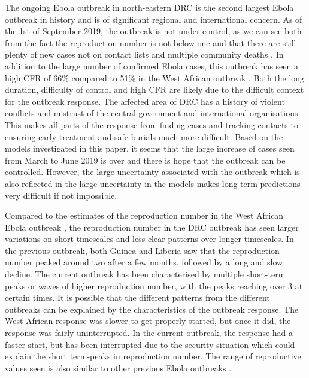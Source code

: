 \documentclass[12pt]{article}
\begin{document}
The ongoing Ebola outbreak in north-eastern DRC is the second largest Ebola outbreak in history and is of significant regional and international concern. As of the 1st of September 2019, the outbreak is not under control, as we can see both from the fact the reproduction number is not below one and that there are still plenty of new cases not on contact lists and multiple community deaths \cite{worldhealthorganisationDiseaseOutbreakNews}. In addition to the large number of confirmed Ebola cases, this outbreak has seen a high CFR of 66\% compared to 51\% in the West African outbreak \cite{rojekSystematicReviewMetaanalysis2019}. Both the long duration, difficulty of control and high CFR are likely due to the difficult context for the outbreak response. The affected area of DRC has a history of violent conflicts and mistrust of the central government and international organisations. This makes all parts of the response from finding cases and tracking contacts to ensuring early treatment and safe burials much more difficult. Based on the models investigated in this paper, it seems that the large increase of cases seen from March to June 2019 is over and there is hope that the outbreak can be controlled. However, the large uncertainty associated with the outbreak which is also reflected in the large uncertainty in the models makes long-term predictions very difficult if not impossible.

Compared to the estimates of the reproduction number in the West African Ebola outbreak \cite{WestAfricanEbola2015}, the reproduction number in the DRC outbreak has seen larger variations on short timescales and less clear patterns over longer timescales. In the previous outbreak, both Guinea and Liberia saw that the reproduction number peaked around two after a few months, followed by a long and slow decline. The current outbreak has been characterised by multiple short-term peaks or waves of higher reproduction number, with the peaks reaching over 3 at certain times. It is possible that the different patterns from the different outbreaks can be explained by the characteristics of the outbreak response. The West African response was slower to get properly started, but once it did, the response was fairly uninterrupted. In the current outbreak, the response had a faster start, but has been interrupted due to the security situation which could explain the short term-peaks in reproduction number. The range of reproductive values seen is also similar to other previous Ebola outbreaks \cite{legrandUnderstandingDynamicsEbola2007}.
\end{document}
